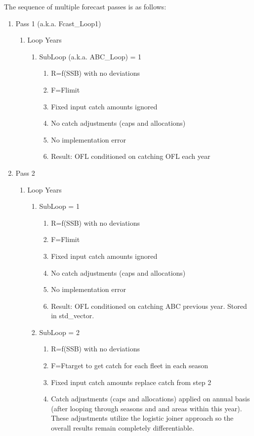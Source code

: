The sequence of multiple forecast passes is as follows:
\begin{enumerate}
	\item Pass 1 (a.k.a. Fcast\_Loop1)
	\begin{enumerate}
		\item Loop Years
		\begin{enumerate}
			\item SubLoop (a.k.a. ABC\_Loop) = 1
			\begin{enumerate}
				\item R=f(SSB) with no deviations
				\item F=Flimit
				\item Fixed input catch amounts ignored
				\item No catch adjustments (caps and allocations)
				\item No implementation error
				\item Result: OFL conditioned on catching OFL each year
			\end{enumerate}
		\end{enumerate}
	\end{enumerate}
	\item Pass 2
	\begin{enumerate}
		\item Loop Years
		\begin{enumerate}
			\item SubLoop = 1
			\begin{enumerate}
				\item R=f(SSB) with no deviations
				\item F=Flimit
				\item Fixed input catch amounts ignored
				\item No catch adjustments (caps and allocations)
				\item No implementation error
				\item Result: OFL conditioned on catching ABC previous year. Stored in std\_vector.
			\end{enumerate}
			\item SubLoop = 2
			\begin{enumerate}
				\item R=f(SSB) with no deviations
				\item F=Ftarget to get catch for each fleet in each season
				\item Fixed input catch amounts replace catch from step 2
				\item Catch adjustments (caps and allocations) applied on annual basis (after looping through seasons and and areas within this year). These adjustments utilize the logistic joiner approach so the overall results remain completely differentiable.

\end{enumerate}
\end{enumerate}
\end{enumerate}
\end{enumerate}
